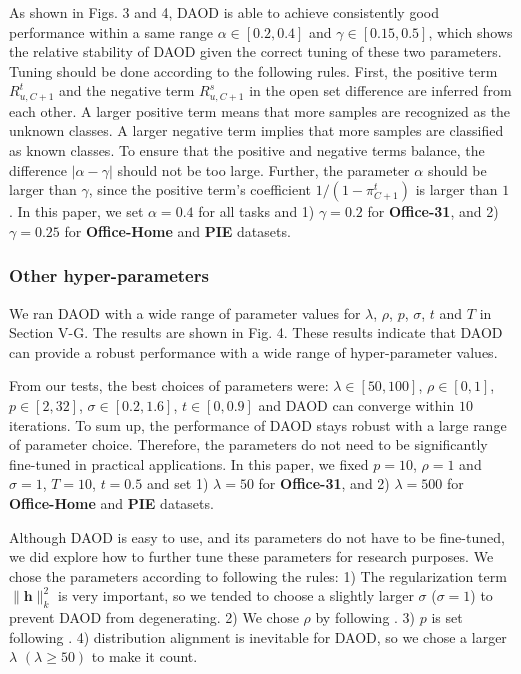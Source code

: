 \documentclass[journal]{IEEEtran}
\begin{document}
As shown in Figs. 3 and 4, DAOD is able to achieve consistently good performance within a same range $\alpha \in [0.2, 0.4]$ and $\gamma \in [0.15, 0.5]$, which shows the relative stability of DAOD given the correct tuning of these two parameters.
Tuning should be done according to the following rules. First, the positive term  $R^t_{u,C+1}$ and the negative term $R^s_{u,C+1}$ in the open set difference are inferred from each other. A larger positive term means that more samples are recognized as the unknown classes. A larger negative term implies that more samples are classified as known classes. To ensure that the positive and negative terms balance, the difference $|\alpha-\gamma|$ should not be too large.  Further, the parameter $\alpha$ should be larger than $\gamma$, since the positive term's coefficient  $1/(1-\pi^t_{C+1})$ is larger than $1$. In this paper, we set $\alpha=0.4$ for all tasks and 1) $\gamma=0.2$ for \textbf{Office-31}, and 2) $\gamma=0.25$ for \textbf{Office-Home} and \textbf{PIE} datasets.

\subsubsection{{Other hyper-parameters}}
We ran DAOD with a wide range of parameter values for $\lambda$, $\rho$, $p$, $\sigma$, $t$ and $T$ in Section V-G. The results are shown in Fig. 4. These results indicate that DAOD can provide a robust performance with a wide range of hyper-parameter values.

From our tests, the best choices of parameters were: $\lambda \in [50,100]$, $\rho \in [0,1]$, $p\in [2,32]$, $\sigma \in [0.2,1.6]$, $t\in [0,0.9]$ and DAOD can converge within $10$ iterations. To sum up, the performance of DAOD stays robust with a large range of parameter choice. Therefore, the parameters do not need to be significantly fine-tuned in practical applications.
In this paper, we fixed $p=10$, $\rho=1$ and $\sigma=1$, $T=10$, $t=0.5$ and set 1) $\lambda=50$ for \textbf{Office-31}, and 2) $\lambda=500$ for \textbf{Office-Home} and \textbf{PIE} datasets.

Although DAOD is easy to use, and its parameters do not have to be fine-tuned, we did explore how to further tune these parameters for research purposes. We chose the parameters according to following the rules: 1) The regularization term $\|{\bm h}\|^2_k$ is very important, so we tended to choose a slightly larger $\sigma$ ($\sigma=1$) to prevent DAOD from degenerating. 2)  We chose $\rho$ by following \cite{DBLP:journals/jmlr/BelkinNS06}. 3) $p$ is set following \cite{DBLP:journals/jmlr/BelkinNS06,DBLP:journals/pami/CaiHHH11}. 4)  distribution alignment is inevitable for DAOD, so we chose a larger $\lambda$ $(\lambda\geq 50)$ to make it count. 
\end{document}
